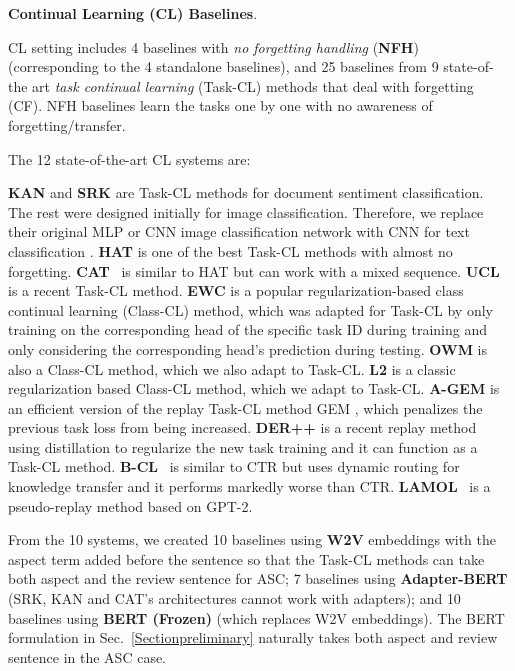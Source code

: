 \documentclass{article}
\begin{document}
\textbf{Continual Learning (CL) Baselines}. {\color{black}CL setting includes 4 baselines with \textit{no forgetting handling} (\textbf{NFH}) (corresponding to the 4 standalone baselines), and 25 baselines from 9 state-of-the art \textit{task continual learning} (Task-CL) methods that deal with forgetting (CF). NFH baselines 
learn the tasks one by one with no awareness of forgetting/transfer.


The 12 state-of-the-art CL systems are:} \textbf{KAN} \cite{ke2020continual} and \textbf{SRK} \cite{DBLP:conf/dasfaa/LvWLCZ19} are Task-CL methods for document sentiment classification. The rest were designed initially for image classification. Therefore, we replace their original MLP or CNN image classification network with CNN for text classification \cite{DBLP:conf/emnlp/Kim14}. 
\textbf{HAT} 
\cite{Serra2018overcoming} is one of the best Task-CL methods with almost no forgetting. \textbf{CAT}~\cite{ke2020mixed}
is similar to HAT but can work with a mixed sequence.  \textbf{UCL}
\cite{DBLP:conf/nips/AhnCLM19} is a recent Task-CL method. \textbf{EWC} \cite{Kirkpatrick2017overcoming} is a popular regularization-based class continual learning (Class-CL) method, which was adapted for Task-CL by only training on the corresponding head of the specific task ID during training and only considering the corresponding head's prediction during testing.
\textbf{OWM} \cite{zeng2019continuous} is also a Class-CL method, which we also adapt to Task-CL. \textbf{L2} \cite{Kirkpatrick2017overcoming} is a classic regularization based Class-CL method, which we adapt to Task-CL.  \textbf{A-GEM} \cite{Chaudhry2019ICLR} is an efficient version of the replay Task-CL method GEM \cite{Lopez2017gradient}, which penalizes the previous task loss from being increased. \textbf{DER++} \cite{buzzega2020dark} is a recent replay method using distillation to regularize the new task training and it can function as a Task-CL method. {\color{black}\textbf{B-CL}~\cite{ke2021adapting} is similar to CTR but uses dynamic routing for knowledge transfer and it performs markedly worse than CTR. \textbf{LAMOL}~\cite{sun2020lamol} is a pseudo-replay method based on GPT-2.}


From the 10 systems, we created {10 baselines} using \textbf{W2V} embeddings with the aspect term added before the sentence so that the Task-CL methods can take both aspect and the review sentence for ASC; {7 baselines} using \textbf{Adapter-BERT} (SRK, KAN and CAT's architectures cannot work with adapters); and {10 baselines} using \textbf{BERT (Frozen)} (which replaces W2V embeddings). The BERT formulation in Sec.~\ref{Sectionpreliminary} naturally takes both aspect and review sentence in the ASC case. 
\end{document}
